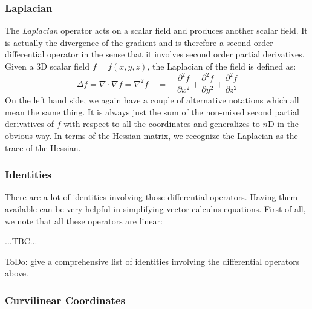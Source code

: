 \subsubsection{Laplacian}
The \emph{Laplacian} operator acts on a scalar field and produces another scalar field. It is actually the divergence of the gradient and is therefore a second order differential operator in the sense that it involves second order partial derivatives. Given a 3D scalar field $f = f(x,y,z)$, the Laplacian of the field is defined as:
\begin{equation}
 \Delta f = \nabla \cdot \nabla f = \nabla^2 f \quad = \quad
 \frac{\partial^2 f}{\partial x^2} + 
 \frac{\partial^2 f}{\partial y^2} + 
 \frac{\partial^2 f}{\partial z^2}   
\end{equation}
On the left hand side, we again have a couple of alternative notations which all mean the same thing. It is always just the sum of the non-mixed second partial derivatives of $f$ with respect to all the coordinates and generalizes to $n$D in the obvious way. In terms of the Hessian matrix, we recognize the Laplacian as the trace of the Hessian. %


\subsubsection{Identities}
There are a lot of identities involving those differential operators. Having them available can be very helpful in simplifying vector calculus equations. First of all, we note that all these operators are linear:

...TBC...

ToDo: give a comprehensive list of identities involving the differential operators above.





\subsubsection{Curvilinear Coordinates}

